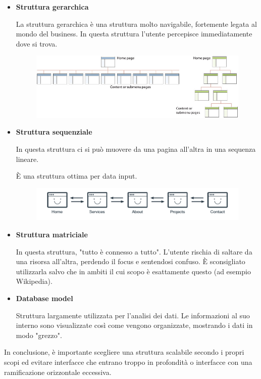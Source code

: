 \begin{itemize}
	\item \textbf{Struttura gerarchica}

La struttura gerarchica è una struttura molto navigabile, fortemente legata al mondo del business. In questa struttura l'utente percepisce immediatamente dove si trova.
\begin{figure}[!h]
	\centering
	\includegraphics[scale = 0.6]{"immagini/hierarchical"}
\end{figure}
	\item \textbf{Struttura sequenziale}

In questa struttura ci si può muovere da una pagina all'altra in una sequenza lineare.

È una struttura ottima per data input.
\begin{figure}[!h]
	\centering
	\includegraphics[scale = 0.7]{"immagini/sequential"}
\end{figure}
	\item \textbf{Struttura matriciale}

In questa struttura, "tutto è connesso a tutto". L'utente rischia di saltare da una risorsa all'altra, perdendo il focus e sentendosi confuso. È sconsigliato utilizzarla salvo che in ambiti il cui scopo è esattamente questo (ad esempio Wikipedia).
	\item \textbf{Database model}

Struttura largamente utilizzata per l'analisi dei dati. Le informazioni al suo interno sono visualizzate così come vengono organizzate, mostrando i dati in modo 
"grezzo".
\end{itemize}

In conclusione, è importante scegliere una struttura scalabile secondo i propri scopi ed evitare interfacce che entrano troppo in profondità o interfacce con una ramificazione orizzontale eccessiva.

